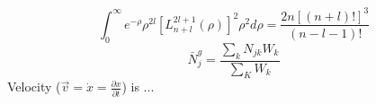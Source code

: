\documentclass{article}
\begin{document}
    \begin{equation}
        \int_0^{\infty} e^{-\rho} \rho^{2l}\left[ L_{n+l}^{2l+1} \left(\rho \right) \right]^2 \rho^2 d\rho = \frac{2n \left[\left(n+l\right)!  \right]^3}{(n-l-1)!}
    \end{equation}
	\[
		\bar{N}_j^g = \frac{\sum\limits_{k} N_{jk} W_k}{\sum\limits_{K} W_k}
	\]
	Velocity ($\vec{v} = \dot{x} = \frac{\partial x}{\partial t}$) is ...
\end{document}
